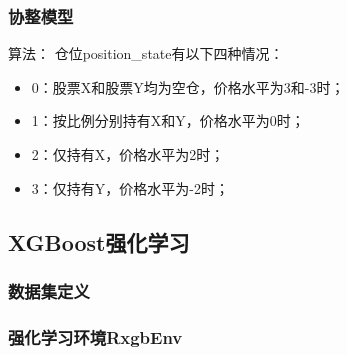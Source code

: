 \subsubsection{协整模型}

算法：
仓位position\_state有以下四种情况：
\begin{itemize}
\item 0：股票X和股票Y均为空仓，价格水平为3和-3时；
\item 1：按比例分别持有X和Y，价格水平为0时；
\item 2：仅持有X，价格水平为2时；
\item 3：仅持有Y，价格水平为-2时；
\end{itemize}


\subsection{XGBoost强化学习}
\subsubsection{数据集定义}
\subsubsection{强化学习环境RxgbEnv}
















